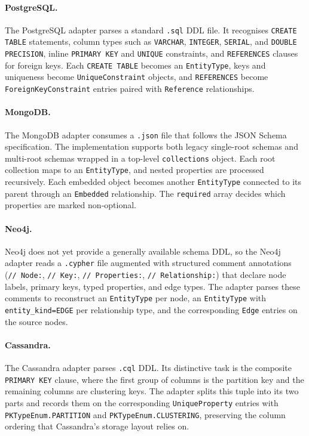   \paragraph{PostgreSQL.}\label{par:adapter-pg}
  The PostgreSQL adapter parses a standard \texttt{.sql} DDL file. It
  recognises \texttt{CREATE TABLE} statements, column types such as
  \texttt{VARCHAR}, \texttt{INTEGER}, \texttt{SERIAL}, and
  \texttt{DOUBLE PRECISION}, inline \texttt{PRIMARY KEY} and
  \texttt{UNIQUE} constraints, and \texttt{REFERENCES} clauses for
  foreign keys. Each \texttt{CREATE TABLE} becomes an
  \texttt{EntityType}, keys and uniqueness become \texttt{UniqueConstraint}
  objects, and \texttt{REFERENCES} become \texttt{ForeignKeyConstraint}
  entries paired with \texttt{Reference} relationships.

  \paragraph{MongoDB.}\label{par:adapter-mongo}
  The MongoDB adapter consumes a \texttt{.json} file that follows the
  JSON Schema specification. The implementation supports both legacy
  single-root schemas and multi-root schemas wrapped in a top-level
  \texttt{collections} object. Each root collection maps to an
  \texttt{EntityType}, and nested properties are processed recursively.
  Each embedded object becomes another \texttt{EntityType} connected to
  its parent through an \texttt{Embedded} relationship. The
  \texttt{required} array decides which properties are marked
  non-optional.

  \paragraph{Neo4j.}\label{par:adapter-neo4j}
  Neo4j does not yet provide a generally available schema DDL, so the
  Neo4j adapter reads a \texttt{.cypher} file augmented with structured
  comment annotations (\texttt{// Node:}, \texttt{// Key:},
  \texttt{// Properties:}, \texttt{// Relationship:}) that declare node
  labels, primary keys, typed properties, and edge types. The adapter
  parses these comments to reconstruct an \texttt{EntityType} per node,
  an \texttt{EntityType} with \texttt{entity\_kind=EDGE} per
  relationship type, and the corresponding \texttt{Edge} entries on the
  source nodes.

  \paragraph{Cassandra.}\label{par:adapter-cassandra}
  The Cassandra adapter parses \texttt{.cql} DDL. Its distinctive task
  is the composite \texttt{PRIMARY KEY} clause, where the first group
  of columns is the partition key and the remaining columns are
  clustering keys. The adapter splits this tuple into its two parts and
  records them on the corresponding \texttt{UniqueProperty} entries
  with \texttt{PKTypeEnum.PARTITION} and \texttt{PKTypeEnum.CLUSTERING},
  preserving the column ordering that Cassandra's storage layout relies
  on.

